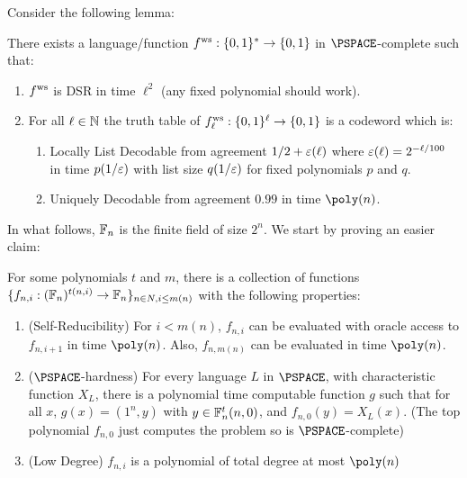Consider the following lemma:
\begin{lemma}\label{lem:DSR-ECC-func}
	There exists a language/function $ f^{\text{ws}}  :\{0,1\}^* \rightarrow \{0,1\}$ in $\PSPACE$-complete such that:
	\begin{enumerate}
		\item $ f^{\text{ws}} $ is DSR in time ${\ell}^2$ (any fixed polynomial should work).
		\item For all $\ell \in \mathbb{N}$ the truth table of $ f^{\text{ws}} _{\ell} : \{0,1\}^\ell \rightarrow \{0,1\}$ is a codeword
		which is:
		\begin{enumerate}
			\item Locally List Decodable from agreement $1/2 + \varepsilon(\ell)$ where $\varepsilon(\ell) = 2^{-\ell /
				100}$ in time $p(1/\varepsilon)$ with list size $q(1 / \varepsilon)$ for fixed polynomials $p$ and $q$.
			\item Uniquely Decodable from agreement $0.99$ in time $\poly(n)$.
		\end{enumerate}
	\end{enumerate}
\end{lemma}

In what follows, $\mathbb{F}_n$ is the finite field of size $2^n$. We start by proving an easier claim:
\begin{claim}\label{clm:USR-func-fam}
	For some polynomials $t$ and $m$, there is a collection of functions \\ $\{f_{n,i} : (\mathbb{F}_n)^{t(n,i)} \rightarrow \mathbb{F}_n\}_{n \in N,i \leq m(n)}$ with the following properties:
	\begin{enumerate}
		\item (Self-Reducibility) For $i < m(n)$, $f_{n,i}$ can be evaluated with oracle access	to $f_{n,i+1}$ in time $\poly(n)$. Also, $f_{n,m(n)}$ can be evaluated in time $\poly(n)$.
		\item ($\PSPACE$-hardness)  For every language $L$ in $\PSPACE$, with characteristic function $X_L$, there is a polynomial time computable function $g$ such that for all $x$, $g(x) = (1^n, y)$ with $y \in \mathbb{F}_n^t(n,0)$, and $f_{n,0}(y) = X_L(x)$. (The top polynomial $f_{n,0}$ just computes the problem so is $\PSPACE$-complete)
		\item (Low Degree) $f_{n,i}$ is a polynomial of total degree at most $\poly(n)$
	\end{enumerate}
\end{claim}

